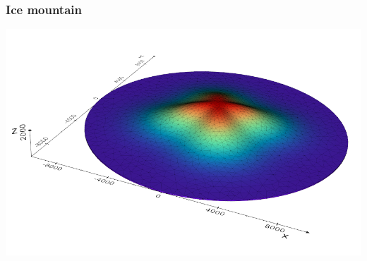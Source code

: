 \documentclass[10pt,final,xcolor=dvipsnames]{beamer}
\begin{document}
\begin{frame}
	\frametitle{Ice mountain}
	\begin{center}
		\includegraphics[width=0.7\columnwidth]{Mesh_Height.png}
	\end{center}
\end{frame}
\end{document}
